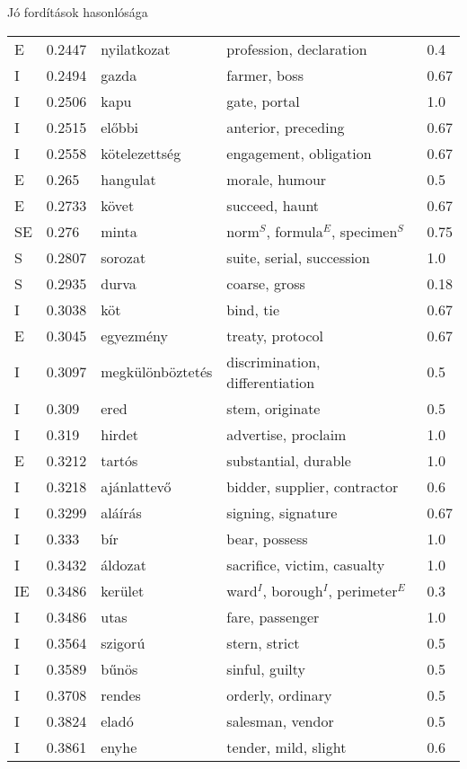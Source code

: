 \documentclass{beamer}
\newcommand{\e}{$^E$}
\newcommand{\id}{$^I$}
\newcommand{\s}{$^S$}
\begin{document}
\begin{frame}[allowframebreaks]{Jó fordítások hasonlósága}
\begin{longtable}{lllll}
        E	& 0.2447	& nyilatkozat	& profession, declaration	& 0.4 \\
        I	& 0.2494	& gazda	& farmer, boss	& 0.67 \\
        I	& 0.2506	& kapu	& gate, portal	& 1.0 \\
        I	& 0.2515	& előbbi	& anterior, preceding	& 0.67 \\
        I	& 0.2558	& kötelezettség	& engagement, obligation	& 0.67 \\
        E	& 0.265	& hangulat	& morale, humour	& 0.5 \\
        E	& 0.2733	& követ	& succeed, haunt	& 0.67 \\
        SE	& 0.276	& minta	& norm\s, formula\e, specimen\s	& 0.75  \\
        S	& 0.2807	& sorozat	& suite, serial, succession	& 1.0 \\
        S	& 0.2935	& durva	& coarse, gross	& 0.18 \\
        I	& 0.3038	& köt	& bind, tie	& 0.67 \\
        E	& 0.3045	& egyezmény	& treaty, protocol	& 0.67 \\
        I	& 0.3097	& megkülönböztetés	& discrimination, differentiation	& 0.5 \\
        I	& 0.309	& ered	& stem, originate	& 0.5 \\
        I	& 0.319	& hirdet	& advertise, proclaim	& 1.0 \\
        E	& 0.3212	& tartós	& substantial, durable	& 1.0 \\
        I	& 0.3218	& ajánlattevő	& bidder, supplier, contractor	& 0.6 \\
        I	& 0.3299	& aláírás	& signing, signature	& 0.67 \\
        I	& 0.333	& bír	& bear, possess	& 1.0 \\
        I	& 0.3432	& áldozat	& sacrifice, victim, casualty	& 1.0 \\
        IE	& 0.3486	& kerület	& ward\id, borough\id, perimeter\e	& 0.3  \\
        I	& 0.3486	& utas	& fare, passenger	& 1.0 \\
        I	& 0.3564	& szigorú	& stern, strict	& 0.5 \\
        I	& 0.3589	& bűnös	& sinful, guilty	& 0.5 \\
        I	& 0.3708	& rendes	& orderly, ordinary	& 0.5 \\
        I	& 0.3824	& eladó	& salesman, vendor	& 0.5 \\
        I	& 0.3861	& enyhe	& tender, mild, slight	& 0.6 \\

\end{longtable}
\end{frame}
\end{document}
